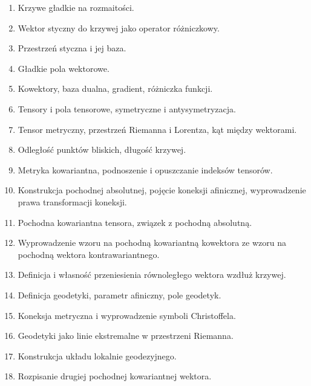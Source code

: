 \documentclass[a4paper,11pt]{article}
\begin{document}
\begin{enumerate}
\item Krzywe gładkie na rozmaitości.

\item Wektor styczny do krzywej jako operator różniczkowy.

\item Przestrzeń styczna i jej baza.

\item Gładkie pola wektorowe.

\item Kowektory, baza dualna, gradient, różniczka funkcji.

\item Tensory i pola tensorowe, symetryczne i antysymetryzacja.

\item Tensor metryczny, przestrzeń Riemanna i Lorentza, kąt między
  wektorami.

\item Odległość punktów bliskich, długość krzywej.

\item Metryka kowariantna, podnoszenie i opuszczanie indeksów
  tensorów.

\item Konstrukcja pochodnej absolutnej, pojęcie koneksji afinicznej,
  wyprowadzenie prawa transformacji koneksji.

\item Pochodna kowariantna tensora, związek z pochodną absolutną.

\item Wyprowadzenie wzoru na pochodną kowariantną kowektora ze wzoru
  na pochodną wektora kontrawariantnego.

\item Definicja i własność przeniesienia równoległego wektora wzdłuż
  krzywej.

\item Definicja geodetyki, parametr afiniczny, pole geodetyk.

\item Koneksja metryczna i wyprowadzenie symboli Christoffela.

\item Geodetyki jako linie ekstremalne w przestrzeni Riemanna.

\item Konstrukcja układu lokalnie geodezyjnego.

\item Rozpisanie drugiej pochodnej kowariantnej wektora.


\end{enumerate}
\end{document}
